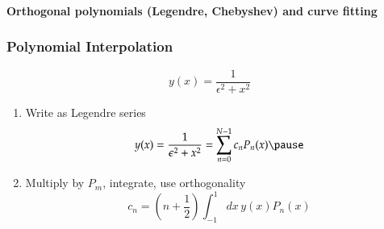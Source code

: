 \begin{frame}
  \frametitle{}
  \begin{center}
    \textbf{\Large Orthogonal polynomials (Legendre, Chebyshev) and curve fitting}
  \end{center}
\end{frame}

\begin{frame}
  \frametitle{Polynomial Interpolation\\
    }
  \begin{tcolorbox}
    \begin{equation*}
      y(x) = \frac{1}{\epsilon^2+x^2}
    \end{equation*}
  \end{tcolorbox}
  \pause
  \begin{enumerate}
  \item<2-> Write as Legendre series
    \begin{equation*}
      y(x) = \frac{1}{\epsilon^2+x^2} = \sum_{n=0}^{N-1} c_n P_n(x) \pause
    \end{equation*}
  \item<3-> Multiply by $P_m$, integrate, use orthogonality
    \begin{equation*}
      c_n = \left(n+\frac{1}{2}\right) \int_{-1}^{1} dx \, y(x) P_n(x)
    \end{equation*}
  \end{enumerate}
\end{frame}

